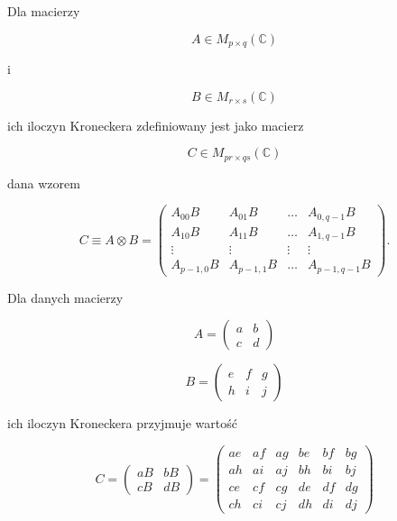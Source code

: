 \begin{definition}
    Dla macierzy

    $$
        A \in M_{p \times q}(\mathbb{C})
    $$

    i

    $$
        B \in M_{r\times s}(\mathbb{C})
    $$

    ich iloczyn Kroneckera zdefiniowany jest jako macierz

    $$
        C \in M_{pr\times qs}(\mathbb{C})
    $$

    dana wzorem

    \begin{equation}
        \label{equation:kronecker-product}
        C \equiv A \otimes B =
        \begin{pmatrix}
            A_{00} B & A_{01} B & \ldots & A_{0, q - 1} B \\
            A_{10} B & A_{11} B & \ldots & A_{1, q - 1} B \\
            \vdots & \vdots & \vdots & \vdots \\
            A_{p - 1, 0} B & A_{p - 1, 1} B & \ldots & A_{p - 1, q - 1} B
        \end{pmatrix}.
    \end{equation}
\end{definition}

\begin{example}
    Dla danych macierzy

    $$
        A =
        \begin{pmatrix}
            a & b \\
            c & d
        \end{pmatrix}
    $$

    $$
        B =
        \begin{pmatrix}
            e & f & g \\
            h & i & j
        \end{pmatrix}
    $$

    ich iloczyn Kroneckera przyjmuje wartość

    $$
        C =
        \begin{pmatrix}
            a B & b B \\
            c B & d B
        \end{pmatrix}
        =
        \begin{pmatrix}
            a e & a f & a g & b e & b f & b g \\
            a h & a i & a j & b h & b i & b j \\
            c e & c f & c g & d e & d f & d g \\
            c h & c i & c j & d h & d i & d j
        \end{pmatrix}
    $$
\end{example}

